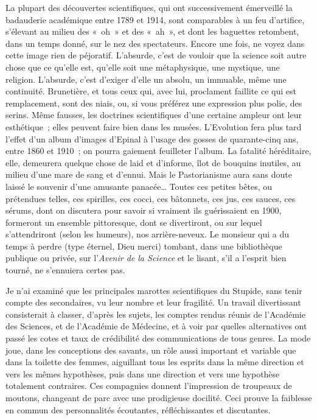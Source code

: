 \documentclass[french,twoside]{book} %
\begin{document}
La plupart des découvertes scientifiques, qui ont successivement émerveillé la badauderie académique entre 1789 et 1914, sont comparables à un feu d’artifice, s’élevant au milieu des « oh » et des « ah », et dont les baguettes retombent, dans un temps donné, sur le nez des spectateurs. Encore une fois, ne voyez dans cette image rien de péjoratif. L’absurde, c’est de vouloir que la science soit autre chose que ce qu’elle est, qu’elle soit une métaphysique, une mystique, une religion. L’absurde, c’est d’exiger d’elle un absolu, un immuable, même une continuité. Brunetière, et tous ceux qui, avec lui, proclament faillite ce qui est remplacement, sont des niais, ou, si vous préférez une expression plus polie, des serins. Même fausses, les doctrines scientifiques d’une certaine ampleur ont leur esthétique ; elles peuvent faire bien dans les musées. L’Evolution fera plus tard l’effet d’un album d’images d’Epinal à l’usage des gosses de quarante-cinq ans, entre 1860 et 1910 ; on pourra gaiement feuilleter l’album. La fatalité héréditaire, elle, demeurera quelque chose de laid et d’informe, îlot de bouquins inutiles, au milieu d’une mare de sang et d’ennui. Mais le Pastorianisme aura sans doute laissé le souvenir d’une amusante panacée… Toutes ces petites bêtes, ou prétendues telles, ces spirilles, ces cocci, ces bâtonnets, ces jus, ces sauces, ces sérums, dont on discutera pour savoir si vraiment ils guérissaient en 1900, formeront un ensemble pittoresque, dont se divertiront, ou sur lequel s’attendriront (selon les humeurs), nos arrière-neveux. Le monsieur qui a du temps à perdre (type éternel, Dieu merci) tombant, dans une bibliothèque publique ou privée, sur l’{\itshape Avenir de la Science} et le lisant, s’il a l’esprit bien tourné, ne s’ennuiera certes pas.\par
Je n’ai examiné que les principales marottes scientifiques du Stupide, sans tenir compte des secondaires, vu leur nombre et leur fragilité. Un travail divertissant consisterait à classer, d’après les sujets, les comptes rendus réunis de l’Académie des Sciences, et de l’Académie de Médecine, et à voir par quelles alternatives ont passé les cotes et taux de crédibilité des communications de tous genres. La mode joue, dans les conceptions des savants, un rôle aussi important et variable que dans la toilette des femmes, aiguillant tous les esprits dans la même direction et vers les mêmes hypothèses, puis dans une direction et vers une hypothèse totalement contraires. Ces compagnies donnent l’impression de troupeaux de moutons, changeant de parc avec une prodigieuse docilité. Ceci prouve la faiblesse en commun des personnalités écoutantes, réfléchissantes et discutantes.\par
\end{document}
